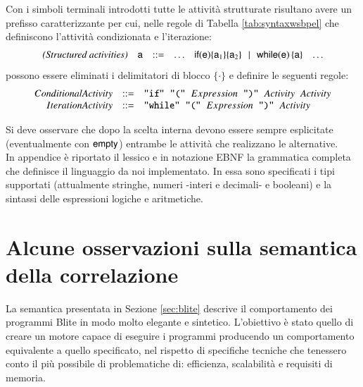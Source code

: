 Con i simboli terminali introdotti tutte le attività strutturate risultano
avere un prefisso caratterizzante per cui, nelle regole di Tabella
\ref{tab:syntaxwsbpel} che definiscono l'attività condizionata e l'iterazione:
$$
\begin{array}{rccccl}
\textit{(Structured activities)} & \xs & ::= & \ldots  &
\xif{\xe}{\xs_1}{\xs_2} \!\sepgr\! \xwhile{\xe}{\xs} & \ldots
\end{array}
$$ 
possono essere eliminati i delimitatori di blocco $\{\cdot \}$ e definire le
seguenti regole: $$
\begin{array}{rcl}
ConditionalActivity & ::= & \verb#"if"# \hspace{0.2cm} \verb#"("#
\hspace{0.2cm} Expression \hspace{0.2cm} \verb#")"#  \hspace{0.2cm} Activity
\hspace{0.2cm} Activity \\

IterationActivity & ::= & \verb#"while"# \hspace{0.2cm} \verb#"("#
\hspace{0.2cm} Expression \hspace{0.2cm} \verb#")"#  \hspace{0.2cm} Activity \\
\end{array}
$$

Si deve osservare che dopo la scelta interna devono essere sempre esplicitate
(eventualmente con ${\sf empty}$) entrambe le attività che realizzano le
alternative.
\\

In appendice è riportato il lessico e in notazione EBNF la grammatica completa
che definisce il linguaggio da noi implementato. In essa sono specificati
i tipi supportati (attualmente stringhe, numeri -interi e decimali- e booleani)
e la sintassi delle espressioni logiche e aritmetiche.

\section{Alcune osservazioni sulla semantica della correlazione}
\label{sec:semcor}

La semantica presentata in Sezione \ref{sec:blite} descrive il comportamento dei
programmi Blite in modo molto elegante e sintetico. L'obiettivo è stato
quello di creare un motore capace di eseguire i programmi producendo un
comportamento equivalente a quello specificato, nel rispetto di specifiche
tecniche che tenessero conto il più possibile di problematiche di: efficienza,
scalabilità e requisiti di memoria.

